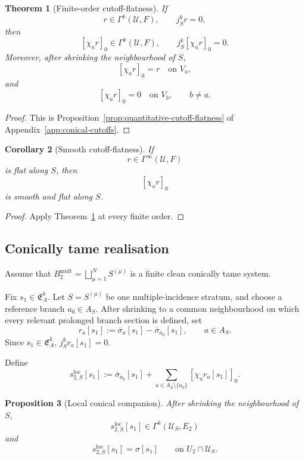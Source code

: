 \documentclass[11pt]{article}
\theoremstyle{plain}
\newtheorem{theorem}{Theorem}[section]
\newtheorem{proposition}[theorem]{Proposition}
\newtheorem{corollary}[theorem]{Corollary}
\theoremstyle{definition}
\begin{document}
\begin{theorem}[Finite-order cutoff-flatness]
\label{thm:finite-order-cutoff-flatness}
If
\[
  r\in\Gamma^k(\mathcal U,F),
  \qquad
  j_S^k r=0,
\]
then
\[
  [\chi_a r]_0\in\Gamma^k(\mathcal U,F),
  \qquad
  j_S^k[\chi_a r]_0=0.
\]
Moreover, after shrinking the neighbourhood of \(S\),
\[
  [\chi_a r]_0=r
  \quad
  \text{on }V_a,
\]
and
\[
  [\chi_a r]_0=0
  \quad
  \text{on }V_b,
  \qquad
  b\neq a.
\]
\end{theorem}

\begin{proof}
This is
Proposition~\ref{prop:quantitative-cutoff-flatness}
of Appendix~\ref{app:conical-cutoffs}.
\end{proof}

\begin{corollary}[Smooth cutoff-flatness]
\label{cor:smooth-cutoff-flatness}
If
\[
  r\in\Gamma^\infty(\mathcal U,F)
\]
is flat along \(S\), then
\[
  [\chi_a r]_0
\]
is smooth and flat along \(S\).
\end{corollary}

\begin{proof}
Apply
Theorem~\ref{thm:finite-order-cutoff-flatness}
at every finite order.
\end{proof}

\subsection{Conically tame realisation}
\label{subsec:conically-tame-realisation}

Assume that \(B_2^{\mathrm{mult}} = \bigsqcup_{\mu=1}^N S^{(\mu)}\) is a finite clean conically tame system.

Fix
\(s_1\in\mathfrak E_A^k\).
Let \(S=S^{(\mu)}\) be one multiple-incidence stratum, and choose a reference branch
\(a_0\in A_S\).
After shrinking to a common neighbourhood on which every relevant
prolonged branch section is defined, set
\[
  r_a[s_1]
  :=
  \overline{\sigma}_a[s_1]
  -
  \overline{\sigma}_{a_0}[s_1],
  \qquad
  a\in A_S.
\]
Since \(s_1\in\mathfrak E_A^k\),
\(j_S^k r_a[s_1]=0\).

Define
\[
  s_{2,S}^{\mathrm{loc}}[s_1]
  :=
  \overline{\sigma}_{a_0}[s_1]
  +
  \sum_{a\in A_S\setminus\{a_0\}}
  [\chi_a r_a[s_1]]_0.
\]

\begin{proposition}[Local conical companion]
\label{prop:local-conical-companion}
After shrinking the neighbourhood of \(S\),
\[
  s_{2,S}^{\mathrm{loc}}[s_1]
  \in
  \Gamma^k(\mathcal U_S,E_2)
\]
and
\[
  s_{2,S}^{\mathrm{loc}}[s_1]
  =
  \sigma[s_1]
  \qquad
  \text{on }U_2\cap\mathcal U_S.
\]
\end{proposition}
\end{document}
